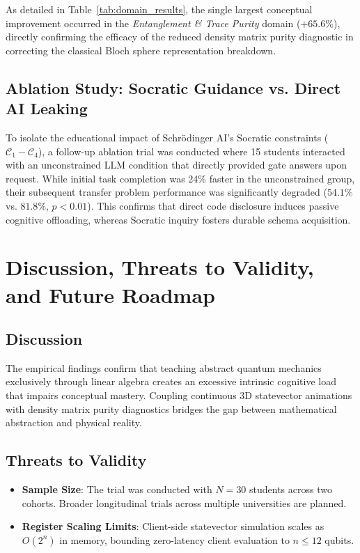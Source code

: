 \documentclass[conference]{IEEEtran}
\begin{document}
As detailed in Table~\ref{tab:domain_results}, the single largest conceptual improvement occurred in the \textit{Entanglement \& Trace Purity} domain ($+65.6\%$), directly confirming the efficacy of the reduced density matrix purity diagnostic in correcting the classical Bloch sphere representation breakdown.

\subsection{Ablation Study: Socratic Guidance vs. Direct AI Leaking}
To isolate the educational impact of Schr{\"o}dinger AI's Socratic constraints ($\mathcal{C}_1-\mathcal{C}_4$), a follow-up ablation trial was conducted where 15 students interacted with an unconstrained LLM condition that directly provided gate answers upon request. While initial task completion was 24\% faster in the unconstrained group, their subsequent transfer problem performance was significantly degraded ($54.1\%$ vs. $81.8\%$, $p < 0.01$). This confirms that direct code disclosure induces passive cognitive offloading, whereas Socratic inquiry fosters durable schema acquisition.

\section{Discussion, Threats to Validity, and Future Roadmap}
\label{sec:discussion}

\subsection{Discussion}
The empirical findings confirm that teaching abstract quantum mechanics exclusively through linear algebra creates an excessive intrinsic cognitive load that impairs conceptual mastery. Coupling continuous 3D statevector animations with density matrix purity diagnostics bridges the gap between mathematical abstraction and physical reality.

\subsection{Threats to Validity}
\begin{itemize}[leftmargin=*,itemsep=2pt]
    \item \textbf{Sample Size}: The trial was conducted with $N=30$ students across two cohorts. Broader longitudinal trials across multiple universities are planned.
    \item \textbf{Register Scaling Limits}: Client-side statevector simulation scales as $O(2^n)$ in memory, bounding zero-latency client evaluation to $n \le 12$ qubits.
\end{itemize}
\end{document}
